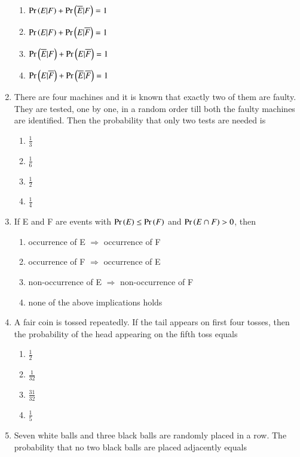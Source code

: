 \documentclass[journal,12pt,twocolumn,article]{IEEEtran}
\theoremstyle{remark}
\begin{document}
\begin{enumerate}[start = 3]
\hfill{}
\begin{enumerate}
\item $\Pr\left(E|F\right)+\Pr\left(\overline{E}|F\right)=1$
\item $\Pr\left(E|F\right)+\Pr\left(E|\overline{F}\right)=1$
\item $\Pr\left(\overline{E}|F\right)+\Pr\left(E|\overline{F}\right)=1$
\item $\Pr\left(E|\overline{F}\right)+\Pr\left(\overline{E}|\overline{F}\right)=1$
\end{enumerate}
\item There are four machines and it is known that exactly two of them are faulty. They are tested, one by one, in a random order till both the faulty machines are identified. Then the probability that only two tests are needed is
\hfill{}
\begin{enumerate}
\item $\frac{1}{3}$
\item $\frac{1}{6}$
\item $\frac{1}{2}$
\item $\frac{1}{4}$
\end{enumerate}
\item If E and F are events with $\Pr\left(E\right) \leq \Pr\left(F\right)$ and $\Pr\left(E\cap F\right)>0$, then
\hfill{}
\begin{enumerate}
\item occurrence of E $\Rightarrow$ occurrence of F
\item occurrence of F $\Rightarrow$ occurrence of E
\item non-occurrence of E $\Rightarrow$ non-occurrence of F
\item none of the above implications holds
\end{enumerate}
\item A fair coin is tossed repeatedly. If the tail appears on first four tosses, then the probability of the head appearing on the fifth toss equals
\hfill{}
\begin{enumerate}
\item $\frac{1}{2}$
\item $\frac{1}{32}$
\item $\frac{31}{32}$
\item $\frac{1}{5}$
\end{enumerate}
\item Seven white balls and three black balls are randomly placed in a row. The probability that no two black balls are placed adjacently equals
\hfill{}
\begin{enumerate}

\end{enumerate}
\end{enumerate}
\end{document}
